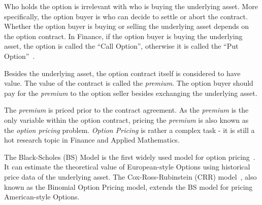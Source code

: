 Who holds the option is irrelevant with who is buying the underlying asset.
More specifically, the option buyer is who can decide to settle or abort the contract.
Whether the option buyer is buying or selling the underlying asset depends on the option contract.
In Finance, if the option buyer is buying the underlying asset, the option is called the ``Call Option'',
otherwise it is called the ``Put Option''~\cite{smith2004history-option}.

Besides the underlying asset, the option contract itself is considered to have value.
The value of the contract is called the \textit{premium}.
The option buyer should pay for the \textit{premium} to the option seller besides exchanging the underlying asset.

The \textit{premium} is priced prior to the contract agreement.
As the \textit{premium} is the only variable within the option contract,
pricing the \textit{premium} is also known as the \textit{option pricing} problem.
\textit{Option Pricing} is rather a complex task - it is still a hot research topic in Finance and Applied Mathematics.

The Black-Scholes (BS) Model is the first widely used model for option pricing~\cite{black1973pricing}.
It can estimate the theoretical value of European-style Options using historical price data of the underlying asset.
The Cox-Ross-Rubinstein (CRR) model~\cite{cox1979option}, also known as the Binomial Option Pricing model, extends the BS model for pricing American-style Options.
